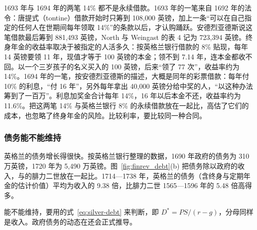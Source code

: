 \begin{pitfall}
1693 年与 1694 年的两笔 14\% 都不是永续借款。1693 年的一笔来自 1692 年的法令：唐提式（tontine）借款开始时只筹到 108,000 英镑，加上一条“可以在自己指定的任何人在世期间每年领取 14\%”的条款以后，才认购踊跃\cite{andreades1909}。安德烈亚德斯说这笔借款最后筹到 881,493 英镑，North 与 Weingast 的表 4 记为 723,394 英镑。终身年金的收益率取决于被指定的人活多久：按英格兰银行借款的 8\% 贴现，每年 14 英镑要领 11 年，现值才等于 100 英镑的本金；领不到 7.14 年，连本金都收不回。以一个三岁孩子的名义买入的 100 英镑，后来“领了 77 次”\cite{andreades1909}，收益率约为 14\%。1694 年的一笔，按安德烈亚德斯的描述，大概是同年的彩票借款：每年付 10\% 的利息，“付 16 年”，另外每年拿出 40,000 英镑分给中奖的人，“以这种办法筹到了一百万”\cite{andreades1909}。利息加奖金合计每年 14\%，16 年以后本金不还，收益率约为 11.6\%。把这两笔 14\% 与英格兰银行 8\% 的永续借款放在一起比，高估了它们的成本，也忽略了终身年金的风险。比较利率，要比较同一种合同。
\end{pitfall}

\subsubsection{债务能不能维持}
英格兰的债务增长得很快。按英格兰银行整理的数据，1690 年政府的债务为 310 万英镑，1720 年为 5,490 万英镑\cite{boe2017,mitchell1988}。图~\ref{fig:finrev_debt}(b) 把债务除以政府的收入，与的腓力二世放在一起比。1714—1738 年，英格兰的债务（含终身与定期年金的估计价值）平均为收入的 9.38 倍，比腓力二世 1565—1596 年的 5.48 倍高得多。


能不能维持，要用的式~\eqref{eq:silver-debt} 来判断，即 $D^{*}=PS/(r-g)$，分母同样是收入。政府债务的动态在还会正式推导。


